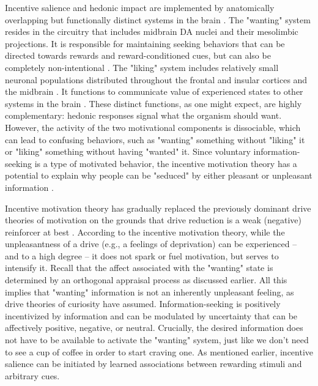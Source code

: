 Incentive salience and hedonic impact are implemented by anatomically overlapping but functionally distinct systems in the brain \cite{berridge_dissecting_2009}. The "wanting" system resides in the circuitry that includes midbrain DA nuclei and their mesolimbic projections. It is responsible for maintaining seeking behaviors that can be directed towards rewards and reward-conditioned cues, but can also be completely non-intentional \cite{berridge_wanting_2009}. The "liking" system includes relatively small neuronal populations distributed throughout the frontal and insular cortices and the midbrain \cite{berridge_pleasure_2015}. It functions to communicate value of experienced states to other systems in the brain \cite{damasio_nature_2013}. These distinct functions, as one might expect, are highly complementary: hedonic responses signal what the organism should want. However, the activity of the two motivational components is dissociable, which can lead to confusing behaviors, such as "wanting" something without "liking" it or "liking" something without having "wanted" it. Since voluntary information-seeking is a type of motivated behavior, the incentive motivation theory has a potential to explain why people can be "seduced" by either pleasant or unpleasant information \cite{fitzgibbon_seductive_2020}.

Incentive motivation theory has gradually replaced the previously dominant drive theories of motivation on the grounds that drive reduction is a weak (negative) reinforcer at best  \cite{berridge_evolving_2018}. According to the incentive motivation theory, while the unpleasantness of a drive (e.g., a feelings of deprivation) can be experienced -- and to a high degree -- it does not spark or fuel motivation, but serves to intensify it. Recall that the affect associated with the "wanting" state is determined by an orthogonal appraisal process as discussed earlier. All this implies that "wanting" information is not an inherently unpleasant feeling, as drive theories of curiosity \cite{berlyne_theory_1954,loewenstein_psychology_1994} have assumed. Information-seeking is positively incentivized by information and can be modulated by uncertainty that can be affectively positive, negative, or neutral. Crucially, the desired information does not have to be available to activate the "wanting" system, just like we don't need to see a cup of coffee in order to start craving one. As mentioned earlier, incentive salience can be initiated by learned associations between rewarding stimuli and arbitrary cues.

